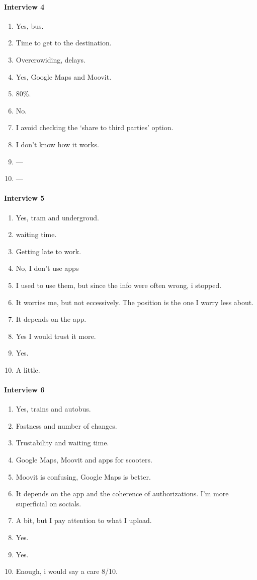 \documentclass[a4paper, 11pt, twocolumn]{article}
\begin{document}
\paragraph*{Interview 4}\begin{enumerate}
	\item Yes, bus.
	\item Time to get to the destination.
	\item Overcrowiding, delays.
	\item Yes, Google Maps and Moovit.
	\item 80\%.
	\item No.
	\item I avoid checking the `share to third parties' option.
	\item I don't know how it works.
	\item ---
	\item ---
\end{enumerate}
\paragraph*{Interview 5}\begin{enumerate}
	\item Yes, tram and undergroud.
	\item waiting time.
	\item Getting late to work.
	\item No, I don't use apps
	\item I used to use them, but since the info were often wrong, i stopped.
	\item It worries me, but not eccessively. The position is the one I worry less about.
	\item It depends on the app.
	\item Yes I would trust it more.
	\item Yes.
	\item A little.
\end{enumerate}
\paragraph*{Interview 6}\begin{enumerate}
	\item Yes, trains and autobus.
	\item Fastness and number of changes.
	\item Trustability and waiting time.
	\item Google Maps, Moovit and apps for scooters.
	\item Moovit is confusing, Google Maps is better.
	\item It depends on the app and the coherence of authorizations. I'm more superficial on socials.
	\item A bit, but I pay attention to what I upload.
	\item Yes.
	\item Yes.
	\item Enough, i would say a care 8/10.
\end{enumerate}
\end{document}
